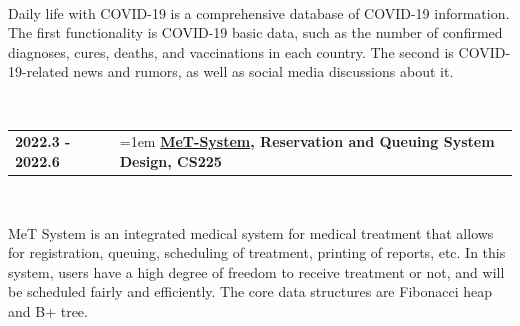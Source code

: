 \documentclass[11pt,english]{article}
\begin{document}
~\

\qquad Daily life with COVID-19 is a comprehensive database of COVID-19 information. The first functionality is COVID-19 basic data, such as the number of confirmed diagnoses, cures, deaths, and vaccinations in each country. The second is COVID-19-related news and rumors, as well as social media discussions about it.

~\

\begin{tabular}{p{1.5in}>{\hangindent=1em}p{5.05in}<{\raggedright}}
\textbf{2022.3 - 2022.6} & \textbf{\href{https://github.com/Erikaqvq/MeT-System}{MeT-System}, Reservation and Queuing System Design, CS225} \\
\end{tabular}

~\

\qquad MeT System is an integrated medical system for medical treatment that allows for registration, queuing, scheduling of treatment, printing of reports, etc. In this system, users have a high degree of freedom to receive treatment or not, and will be scheduled fairly and efficiently. The core data structures are Fibonacci heap and B+ tree.
\end{document}
